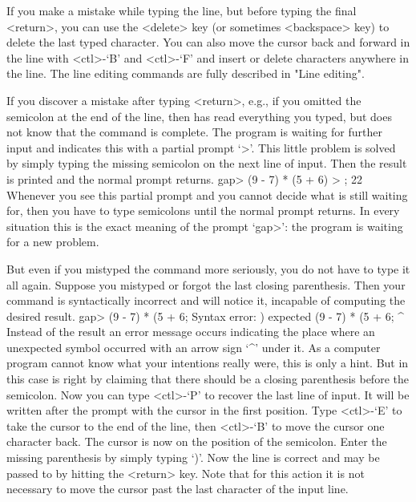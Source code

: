 %
If you make a mistake while typing the  line, but before typing the final
<return>, you can use the <delete> key  (or sometimes <backspace> key) to
delete the last typed  character. You can  also move the cursor  back and
forward  in the line  with <ctl>-`B' and  <ctl>-`F' and  insert or delete
characters  anywhere  in the line.  The  line editing  commands are fully
described in "Line editing".

If you discover a mistake after typing <return>, e.g., if you omitted the
semicolon  at the end of the  line, then {\GAP}  has  read everything you
typed, but does  not know that the command   is complete. The  program is
waiting for further input and  indicates this with  a partial prompt `>'.
This little  problem is solved by simply  typing the missing semicolon on
the next line of input. Then the result is  printed and the normal prompt
returns.
\beginexample
    gap> (9 - 7) * (5 + 6)
    > ;
    22 
\endexample
Whenever you see this partial prompt and you cannot decide what {\GAP} is
still  waiting for, then  you have  to type  semicolons  until the normal
prompt  returns.  In  every situation this  is the  exact meaning of  the
prompt `gap>': the program is waiting for a new problem.

But even if you  mistyped the command more  seriously, you do not have to
type   it all again. Suppose   you  mistyped or  forgot  the last closing
parenthesis. Then your command is syntactically incorrect and {\GAP} will
notice it, incapable of computing the desired result.
\beginexample
    gap> (9 - 7) * (5 + 6;
    Syntax error: ) expected
    (9 - 7) * (5 + 6;
                    ^
\endexample
{}%
Instead of the result an error message  occurs indicating the place where
an unexpected  symbol occurred with   an arrow sign  `^'  under it.  As a
computer program  cannot know what your  intentions really were,  this is
only  a hint. But in this  case {\GAP}  is  right by  claiming that there
should be a closing  parenthesis before the  semicolon. Now you  can type
<ctl>-`P' to recover the last line of input. It will be written after the
prompt with the cursor in the first  position. Type <ctl>-`E' to take the
cursor  to the end of   the line, then <ctl>-`B'   to move the cursor one
character back. The cursor is now on the position of the semicolon. Enter
the missing parenthesis by simply typing `)'. Now the line is correct and
may be passed to {\GAP}  by hitting the <return>  key. Note that for this
action it is not necessary to move the cursor  past the last character of
the input line.

